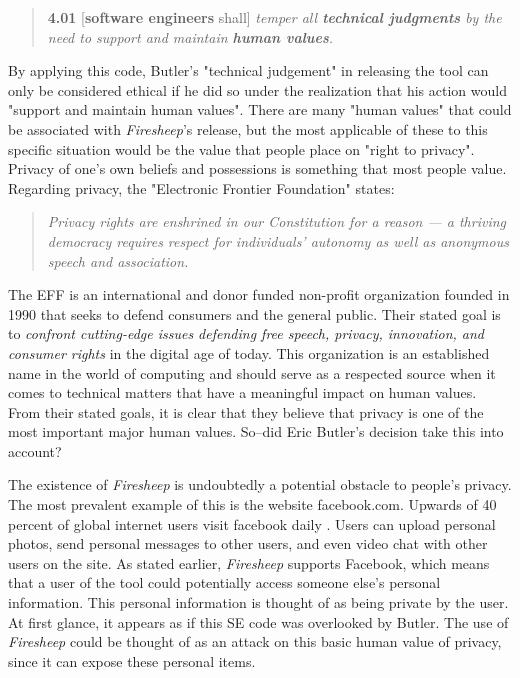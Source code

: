 \documentclass[11pt]{article}
\begin{document}
\begin{multicols}{2}
\begin{quote}
\textbf{4.01} [\textbf{software engineers} shall] \emph{temper all \textbf{technical judgments} by the need to support and maintain \textbf{human values}.} \cite{se_code}
\end{quote}

By applying this code, Butler's "technical judgement" in releasing the tool can only be considered ethical if he did so under the realization that his action would "support and maintain human values". There are many "human values" that could be associated with \emph{Firesheep}'s release, but the most applicable of these to this specific situation would be the value that people place on "right to privacy". Privacy of one's own beliefs and possessions is something that most people value. Regarding privacy, the "Electronic Frontier Foundation" states:

\begin{quote}
  \emph{Privacy rights are enshrined in our Constitution for a reason — a thriving democracy requires respect for individuals' autonomy as well as anonymous speech and association.} \cite{eff_privacy}
\end{quote}

The EFF is an international and donor funded non-profit organization founded in 1990 that seeks to defend consumers and the general public. Their stated goal is to \emph{confront cutting-edge issues defending free speech, privacy, innovation, and consumer rights} \cite{eff_about} in the digital age of today. This organization is an established name in the world of computing and should serve as a respected source when it comes to technical matters that have a meaningful impact on human values. From their stated goals, it is clear that they believe that privacy is one of the most important major human values. So--did Eric Butler's decision take this into account?

The existence of \emph{Firesheep} is undoubtedly a potential obstacle to people's privacy. The most prevalent example of this is the website facebook.com. Upwards of 40 percent of global internet users visit facebook daily \cite{alexa}. Users can upload personal photos, send personal messages to other users, and even video chat with other users on the site. As stated earlier, \emph{Firesheep} supports Facebook, which means that a user of the tool could potentially access someone else's personal information. This personal information is thought of as being private by the user. At first glance, it appears as if this SE code was overlooked by Butler. The use of \emph{Firesheep} could be thought of as an attack on this basic human value of privacy, since it can expose these personal items.


\end{multicols}
\end{document}
